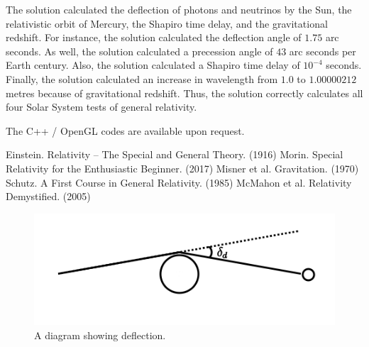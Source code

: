 \documentclass[12pt]{article}
\begin{document}
The solution calculated the deflection of photons and neutrinos by the Sun, the relativistic orbit of Mercury, the Shapiro time delay, and the gravitational redshift.
For instance, the solution calculated the deflection angle of $1.75$ arc seconds.
As well, the solution calculated a precession angle of $43$ arc seconds per Earth century.
Also, the solution calculated a Shapiro time delay of $10^{-4}$ seconds.
Finally, the solution calculated an increase in wavelength from $1.0$ to $1.00000212$ metres because of gravitational redshift.
Thus, the solution correctly calculates all four Solar System tests of general relativity.

The C++ / OpenGL codes are available upon request.






\begin{thebibliography}{9}


 Einstein. Relativity -- The Special and General Theory. (1916)
 Morin. Special Relativity for the Enthusiastic Beginner. (2017)
 Misner et al. Gravitation. (1970)
 Schutz. A First Course in General Relativity. (1985)
 McMahon et al. Relativity Demystified. (2005)

\end{thebibliography}


\pagebreak



\begin{figure} 
\centering
\label{fig1}
  \includegraphics[width = 6 in]{deflection.png}
  \caption{ A diagram showing deflection.
}
\end{figure}
\end{document}
